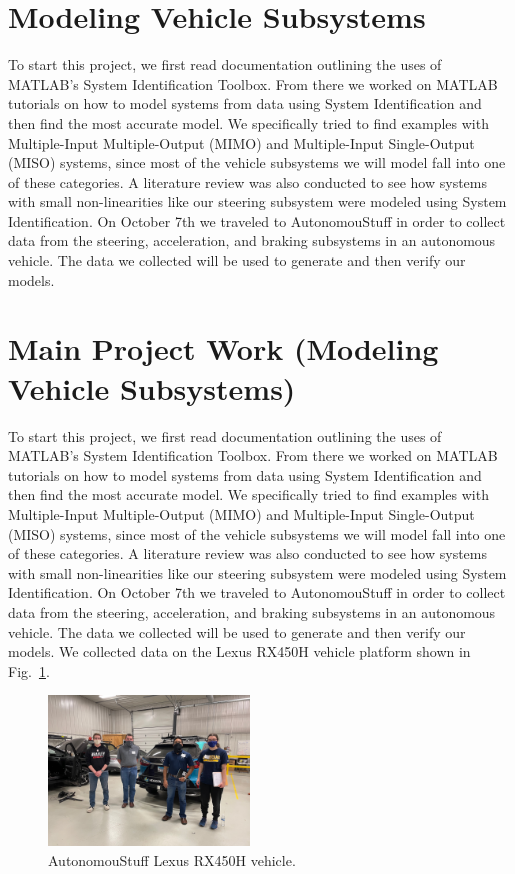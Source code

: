 \documentclass[journal,twoside,web]{ieeecolor}
\begin{document}
\section{Modeling Vehicle Subsystems}
To start this project, we first read documentation outlining the uses of
MATLAB's System Identification Toolbox. From there we worked on MATLAB tutorials
on how to model systems from data using System Identification and then find the
most accurate model. We specifically tried to find examples with Multiple-Input
Multiple-Output (MIMO) and Multiple-Input Single-Output (MISO) systems, since
most of the vehicle subsystems we will model fall into one of these categories.
A literature review was also conducted to see how systems with small
non-linearities like our steering subsystem were modeled using System
Identification. On October 7th we traveled to AutonomouStuff in order to collect
data from the steering, acceleration, and braking subsystems in an autonomous
vehicle. The data we collected will be used to generate and then verify our
models.

\section{Main Project Work (Modeling Vehicle Subsystems)}
To start this project, we first read documentation outlining the uses of MATLAB's System Identification Toolbox. From there we worked on MATLAB tutorials on how to model systems from data using System Identification and then find the most accurate model. We specifically tried to find examples with Multiple-Input Multiple-Output (MIMO) and Multiple-Input Single-Output (MISO) systems, since most of the vehicle subsystems we will model fall into one of these categories. A literature review was also conducted to see how systems with small non-linearities like our steering subsystem were modeled using System Identification. On October 7th we traveled to AutonomouStuff in order to collect data from the steering, acceleration, and braking subsystems in an autonomous vehicle. The data we collected will be used to generate and then verify our models. We collected data on the Lexus RX450H vehicle platform shown in Fig.~\ref{fig:lexusvehicle}. %
%
\begin{figure}[htbp]
	\centering
	\includegraphics[height=4cm]{figs/img/picturesVisitToAStuff/visitors1-20211007}
	\caption{AutonomouStuff Lexus RX450H vehicle.}
	\label{fig:lexusvehicle}
\end{figure}
\end{document}
